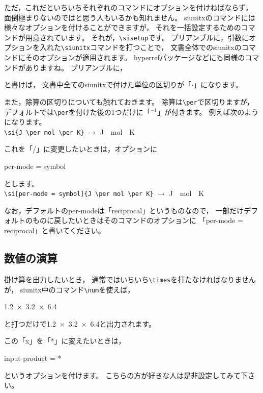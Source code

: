 ただ，これだといちいちそれぞれのコマンドにオプションを付けねばならず，
面倒極まりないのではと思う人もいるかも知れません。
siunitxのコマンドには様々なオプションを付けることができますが，
それを一括設定するためのコマンドが用意されています。
それが，\verb|\sisetup|です。
プリアンブルに，引数にオプションを入れた\verb|\siunitx|コマンドを打つことで，
文書全体でのsiunitxのコマンドにそのオプションが適用されます。
hyperrefパッケージなどにも同様のコマンドがありますね。
プリアンブルに，
\begin{ITeX}
\end{ITeX}
と書けば，
文書中全てのsiunitxで付けた単位の区切りが「$\cdot$」になります。

また，除算の区切りについても触れておきます。
除算は\verb|\per|で区切りますが，
デフォルトでは\verb|\per|を付けた後の1つだけに「${}^{-1}$」が付きます。
例えば次のようになります。\\
\hspace{5zw} \verb|\si{J \per mol \per K}|
$\rightarrow$ \si[per-mode = reciprocal]{J \per mol \per K}

これを「/」に変更したいときは，オプションに
\begin{ITeX}
per-mode = symbol
\end{ITeX}
とします。\\
\hspace{5zw} \verb|\si[per-mode = symbol]{J \per mol \per K}|
$\rightarrow$ \si[per-mode = symbol]{J \per mol \per K}

なお，デフォルトのper-modeは「reciprocal」というものなので，
一部だけデフォルトのものに戻したいときはそのコマンドのオプションに
「per-mode = reciprocal」と書いてください。


\subsection{数値の演算}

掛け算を出力したいとき，
通常ではいちいち\verb|\times|を打たなければなりませんが，
siunitx中のコマンド\verb|\num|を使えば，
\begin{ITeX}
\num{1.2 x 3.2 x 6.4}
\end{ITeX}
と打つだけで\num{1.2 x 3.2 x 6.4}と出力されます。

この「x」を「*」に変えたいときは，
\begin{ITeX}
input-product = *
\end{ITeX}
というオプションを付けます。
こちらの方が好きな人は是非設定してみて下さい。

